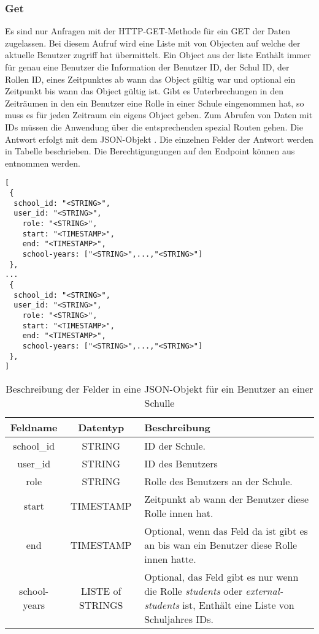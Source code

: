 \subsubsection{Get}
\label{sec:end:rest:api:school:users:get}
Es sind nur Anfragen mit der HTTP-GET-Methode für ein GET der Daten zugelassen.
Bei diesem Aufruf wird eine Liste mit von Objecten auf welche der aktuelle Benutzer zugriff hat übermittelt.
Ein Object aus der liste Enthält immer für genau eine Benutzer die Information der Benutzer ID, der Schul ID, der Rollen ID, eines Zeitpunktes ab wann das Object gültig war und optional ein Zeitpunkt bis wann das Object gültig ist.
Gibt es Unterbrechungen in den Zeiträumen in den ein Benutzer eine Rolle in einer Schule eingenommen hat, so muss es für jeden Zeitraum ein eigens Object geben.
Zum Abrufen von Daten mit IDs müssen die Anwendung über die entsprechenden spezial Routen gehen.
Die Antwort erfolgt mit dem JSON-Objekt . Die einzelnen Felder der Antwort werden in Tabelle  beschrieben.
Die Berechtigungungen auf den Endpoint können aus  entnommen werden.


\begin{lstlisting}[caption={JSON-Antwort für einen GET-Aufruf der Route /api/school/users},label={lst:code:end:rest:api:school:users:get:ret},frame=tlrb]
[
 {
  school_id: "<STRING>",
  user_id: "<STRING>",
	role: "<STRING>",
	start: "<TIMESTAMP>",
	end: "<TIMESTAMP>",
	school-years: ["<STRING>",...,"<STRING>"]
 },
...
 {
  school_id: "<STRING>",
  user_id: "<STRING>",
	role: "<STRING>",
	start: "<TIMESTAMP>",
	end: "<TIMESTAMP>",
	school-years: ["<STRING>",...,"<STRING>"]
 },
]
\end{lstlisting}

\begin{table}[htb]
	\begin{tabularx}{\textwidth}{|c|c|X|}
		\hline
			\textbf{Feldname} & \textbf{Datentyp} & \textbf{Beschreibung} \\ \hline
			school\_id & STRING & ID der Schule. \\ \hline
			user\_id & STRING & ID des Benutzers \\ \hline
			role & STRING & Rolle des Benutzers an der Schule. \\ \hline
			start & TIMESTAMP & Zeitpunkt ab wann der Benutzer diese Rolle innen hat. \\ \hline
			end & TIMESTAMP & Optional, wenn das Feld da ist gibt es an bis wan ein Benutzer diese Rolle innen hatte. \\ \hline
			school-years & LISTE of STRINGS & Optional, das Feld gibt es nur wenn die Rolle \textit{students} oder \textit{external-students} ist, Enthält eine Liste von Schuljahres IDs. \\ \hline 
	\end{tabularx}

		\caption{Beschreibung der Felder in eine JSON-Objekt für ein Benutzer an einer Schulle}
		\label{tab:end:rest:api:school:users:get:ret:json}
\end{table}

